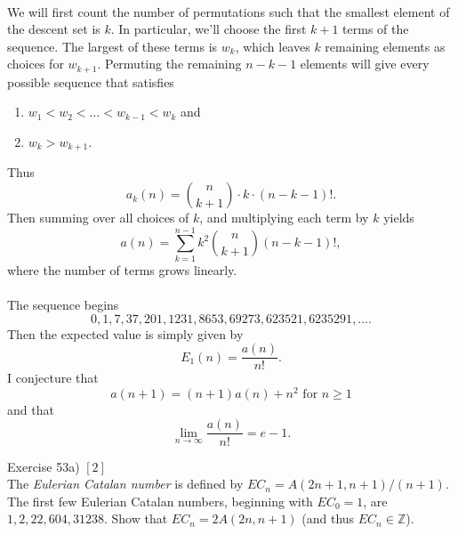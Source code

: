 \documentclass{article}
\newenvironment{problem}[2][Problem]{\begin{trivlist}
\item[\hskip \labelsep {\bfseries #1}\hskip \labelsep {\bfseries #2.}]}{\end{trivlist}}
\newenvironment{solution}[1][Solution.]{\begin{trivlist}
\item[\hskip \labelsep {\bfseries #1}]}{\end{trivlist}}
\begin{document}
\begin{solution} \text{} \\
  We will first count the number of permutations such that the smallest element
  of the descent set is $k$. In particular, we'll choose the first $k + 1$ terms
  of the sequence. The largest of these terms is $w_k$, which leaves $k$
  remaining elements as choices for $w_{k + 1}$. Permuting the remaining
  $n - k - 1$ elements will give every possible sequence that satisfies
  \begin{enumerate}
    \item $w_1 < w_2 < \hdots < w_{k - 1} < w_k$ and
    \item $w_k > w_{k + 1}$.
  \end{enumerate}
  Thus
  \[
    a_k(n) = \binom{n}{k + 1}\cdot{k}\cdot(n - k - 1)!.
  \]
  Then summing over all choices of $k$, and multiplying each term by $k$ yields \[
    a(n) = \sum_{k = 1}^{n - 1} k^2\binom{n}{k + 1}(n - k - 1)!,
  \] where the number of terms grows linearly.
  \\~\\
  The sequence begins \[
    0, 1, 7, 37, 201, 1231, 8653, 69273, 623521, 6235291, \hdots.
  \]
  Then the expected value is simply given by \[
    E_1(n) = \frac{a(n)}{n!}.
  \]
  I conjecture that \[
    a(n+1) = (n+1)a(n) + n^2 \text{ for } n \geq 1
  \] and that \[
    \lim_{n \rightarrow \infty} \frac{a(n)}{n!} = e - 1.
  \]
\end{solution}
\pagebreak
\begin{problem}{3} (Exercise 53a) $[2]$ \\
  The \textit{Eulerian Catalan number} is defined by
  $EC_n = A(2n + 1, n + 1)/(n + 1)$. The first few Eulerian Catalan numbers,
  beginning with $EC_0 = 1$, are $1, 2, 22, 604, 31238$. Show that
  $EC_n = 2A(2n, n+1)$ (and thus $EC_n \in \mathbb Z$).
\end{problem}
\end{document}
